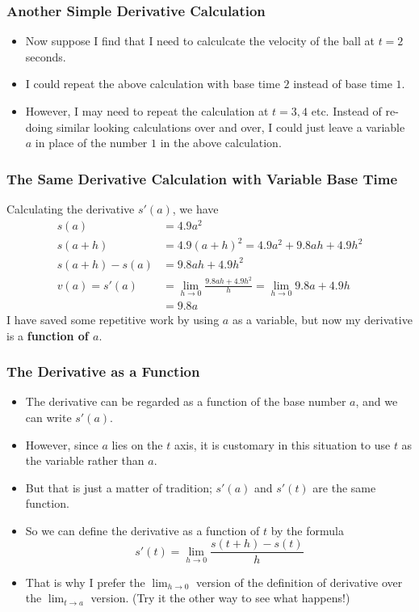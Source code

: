 \documentclass[serif,ignorenonframetext]{beamer}
\newcommand{\ds}{\displaystyle}
\begin{document}
\begin{frame}
  \frametitle{Another Simple Derivative Calculation}
  \begin{itemize}
  \item Now suppose I find that I need to calculcate the velocity of the
    ball at $t=2$ seconds.
  \pause
  \item I could repeat the above calculation with base time $2$ instead
    of base time $1$.
  \pause
  \item However, I may need to repeat the calculation at $t=3,4$ etc.
    Instead of re-doing similar looking calculations over and over, I could
    just leave a variable $a$ in place of the number $1$ in the above
    calculation.
  \end{itemize}
\end{frame}

\begin{frame}
  \frametitle{The Same Derivative Calculation with Variable Base Time}
  Calculating the derivative $s'(a)$, we have
  \begin{align*}
    s(a) &= 4.9 a^2 \\
    s(a+h) &= 4.9(a+h)^2=4.9a^2+9.8ah+4.9h^2 \\
    s(a+h)-s(a) &= 9.8ah + 4.9h^2 \\
    v(a) = s'(a) &= \lim_{h\to 0} \frac{9.8ah+4.9h^2}{h}
    = \lim_{h\to 0} 9.8 a + 4.9 h \\
    &= 9.8a
  \end{align*}
  \pause %
  I have saved some repetitive work by using $a$ as a variable, but now
  my derivative is a \textbf{function of $a$}.
\end{frame}

\begin{frame}
  \frametitle{The Derivative as a Function}
  \begin{itemize}
  \item The derivative can be regarded as a function of the base
    number $a$, and we can write $s'(a)$.
  \pause
  \item However, since $a$ lies on the $t$ axis, it is customary
    in this situation to use $t$ as the variable rather than $a$.
  \pause
  \item But that is just a matter of tradition; $s'(a)$ and $s'(t)$ are
    the same function.
  \pause
  \item So we can define the derivative as a function of $t$ by
    the formula
    \begin{displaymath}
      s'(t) = \lim_{h\to 0} \frac{s(t+h)-s(t)}{h}
    \end{displaymath}
  \pause
  \item That is why I prefer the $\ds\lim_{h\to 0}$ version of the definition
    of derivative over the $\ds\lim_{t\to a}$ version.  (Try it the other way
    to see what happens!)
  \end{itemize}
\end{frame}
\end{document}
